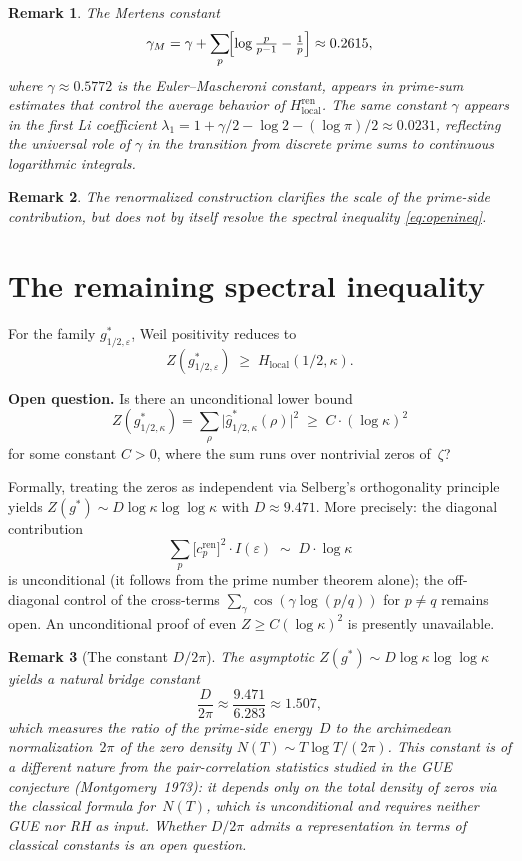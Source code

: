 \documentclass[11pt]{article}
\newtheorem*{remark*}{Remark}
\begin{document}
\begin{remark*}
The Mertens constant
\[
\gamma_M = \gamma + \sum_p\!\Bigl[\log\tfrac{p}{p-1}-\tfrac1p\Bigr]
\approx 0.2615,
\]
where $\gamma \approx 0.5772$ is the Euler--Mascheroni constant,
appears in prime-sum estimates that control the average behavior
of $H_{\mathrm{local}}^{\mathrm{ren}}$.
The same constant $\gamma$ appears in the first Li coefficient
$\lambda_1 = 1 + \gamma/2 - \log 2 - (\log\pi)/2 \approx 0.0231$,
reflecting the universal role of $\gamma$ in the transition
from discrete prime sums to continuous logarithmic integrals.
\end{remark*}

\begin{remark*}
The renormalized construction clarifies the scale of the prime-side
contribution, but does not by itself resolve the spectral inequality
\eqref{eq:openineq}.
\end{remark*}

\section{The remaining spectral inequality}\label{sec:open}

For the family $g^*_{1/2,\varepsilon}$, Weil positivity reduces to
\begin{equation}\label{eq:openineq}
Z(g^*_{1/2,\varepsilon})
\;\ge\;
H_{\mathrm{local}}(1/2,\kappa).
\end{equation}

\textbf{Open question.}
Is there an unconditional lower bound
\[
Z(g^*_{1/2,\kappa})
= \sum_{\rho}\bigl|\widehat g^*_{1/2,\kappa}(\rho)\bigr|^2
\;\ge\;
C\cdot(\log\kappa)^2
\]
for some constant $C>0$, where the sum runs over nontrivial zeros of~$\zeta$?

Formally, treating the zeros as independent via Selberg's
orthogonality principle~\cite{selberg} yields
$Z(g^*)\sim D\log\kappa\log\log\kappa$ with $D\approx 9.471$.
More precisely: the diagonal contribution
\[
\sum_p \bigl[c_p^{\mathrm{ren}}\bigr]^2 \cdot I(\varepsilon)
\;\sim\; D \cdot \log\kappa
\]
is unconditional (it follows from the prime number theorem alone);
the off-diagonal control of the cross-terms
$\sum_\gamma \cos(\gamma\log(p/q))$ for $p\neq q$
remains open. An unconditional proof of even
$Z\ge C(\log\kappa)^2$ is presently unavailable.

\begin{remark*}[The constant $D/2\pi$]
The asymptotic $Z(g^*)\sim D\log\kappa\log\log\kappa$ yields a
natural bridge constant
\[
\frac{D}{2\pi} \approx \frac{9.471}{6.283} \approx 1.507,
\]
which measures the ratio of the prime-side energy~$D$
to the archimedean normalization~$2\pi$ of the zero density
$N(T)\sim T\log T/(2\pi)$.
This constant is of a different nature from the pair-correlation
statistics studied in the GUE conjecture
(Montgomery~1973): it depends only on the total density of zeros
via the classical formula for~$N(T)$, which is unconditional
and requires neither GUE nor RH as input.
Whether $D/2\pi$ admits a representation in terms of
classical constants is an open question.
\end{remark*}
\end{document}
